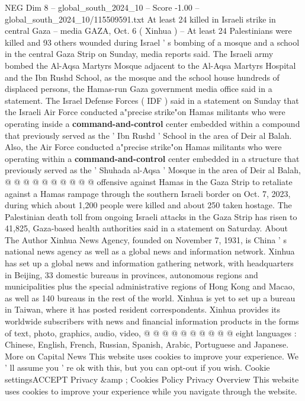 \begin{textsample}{NEG Dim 8 – global\_south\_2024\_10 – Score -1.00 – global\_south\_2024\_10/115509591.txt}  \label{ex:f8_neg_194}
At least 24 killed in Israeli strike in central Gaza -- media GAZA, Oct. 6 ( Xinhua ) -- At least 24 Palestinians were killed and 93 others wounded during Israel ' s bombing of a mosque and a school in the central Gaza Strip on Sunday, media reports said.
The Israeli army bombed the Al-Aqsa Martyrs Mosque adjacent to the Al-Aqsa Martyrs Hospital and the Ibn Rushd School, as the mosque and the school house hundreds of displaced persons, the Hamas-run Gaza government media office said in a statement.
The Israel Defense Forces ( IDF ) said in a statement on Sunday that the Israeli Air Force conducted a"precise strike"on Hamas militants who were operating inside a \textbf{command-and-control} center embedded within a compound that previously served as the ' Ibn Rushd ' School in the area of Deir al Balah.
Also, the Air Force conducted a"precise strike"on Hamas militants who were operating within a \textbf{command-and-control} center embedded in a structure that previously served as the ' Shuhada al-Aqsa ' Mosque in the area of Deir al Balah, @ @ @ @ @ @ @ @ @ @ offensive against Hamas in the Gaza Strip to retaliate against a Hamas rampage through the southern Israeli border on Oct. 7, 2023, during which about 1,200 people were killed and about 250 taken hostage.
The Palestinian death toll from ongoing Israeli attacks in the Gaza Strip has risen to 41,825, Gaza-based health authorities said in a statement on Saturday.
About The Author Xinhua News Agency, founded on November 7, 1931, is China ' s national news agency as well as a global news and information network.
Xinhua has set up a global news and information gathering network, with headquarters in Beijing, 33 domestic bureaus in provinces, autonomous regions and municipalities plus the special administrative regions of Hong Kong and Macao, as well as 140 bureaus in the rest of the world.
Xinhua is yet to set up a bureau in Taiwan, where it has posted resident correspondents.
Xinhua provides its worldwide subscribers with news and financial information products in the forms of text, photo, graphics, audio, video, @ @ @ @ @ @ @ @ @ @ eight languages : Chinese, English, French, Russian, Spanish, Arabic, Portuguese and Japanese.
More on Capital News This website uses cookies to improve your experience.
We ' ll assume you ' re ok with this, but you can opt-out if you wish.
Cookie settingsACCEPT Privacy \&amp ; Cookies Policy Privacy Overview This website uses cookies to improve your experience while you navigate through the website.

\end{textsample}
